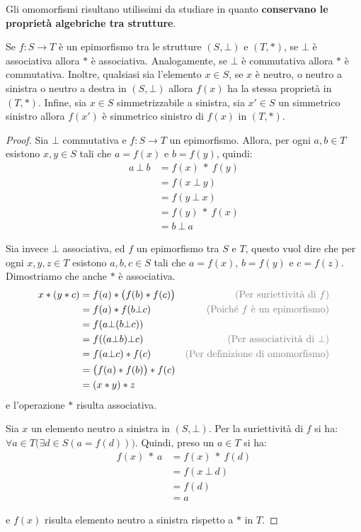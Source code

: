 Gli omomorfismi risultano utilissimi da studiare in quanto \textbf{conservano le proprietà algebriche tra strutture}.

\begin{propbox}
	Se $f:S \rightarrow T$ è un epimorfismo tra le strutture $(S, \bot)$ e $(T, \ast)$, se $\bot$ è associativa allora $\ast$ è associativa. Analogamente, se $\bot$ è commutativa allora $\ast$ è commutativa. Inoltre, qualsiasi sia l'elemento $x \in S$, se $x$ è neutro, o neutro a sinistra o neutro a destra in $(S, \bot)$ allora $f(x)$ ha la stessa proprietà in $(T,\ast)$. Infine, sia $x \in S$ simmetrizzabile a sinistra, sia $x' \in S$ un simmetrico sinistro allora $f(x')$ è simmetrico sinistro di $f(x)$ in $(T, \ast)$.
\end{propbox}


\begin{proof}
	Sia $\bot$ commutativa e $f:S \rightarrow T$ un epimorfismo. Allora, per ogni $a,b \in T$ esistono $x,y \in S$ tali che $a=f(x)$ e $b=f(y)$, quindi:
	\begin{align*}
		a \ \bot \ b &= f(x) \ \ast \ f(y) \\
		&= f(x \ \bot \ y) \\
		&= f(y \ \bot \ x) \\
		&= f(y) \ \ast \ f(x)  \\
		&= b \ \bot \ a
	\end{align*}
	
	Sia invece $\bot$ associativa, ed $f$ un epimorfismo tra $S$ e $T$, questo vuol dire che per ogni $x,y,z \in T$ esistono $a,b,c \in S$ tali che $a=f(x)$, $b=f(y)$ e $c=f(z)$. Dimostriamo che anche $\ast$ è associativa.
	\begin{align*}
	x \ast (y \ast c) &= f(a) \ast \bigl(f(b) \ast f(c) \bigr) & \text{\textcolor{gray}{(Per suriettività di $f$)}} \\
	&= f(a) \ast f(b \bot c)  & \text{\textcolor{gray}{(Poiché $f$ è un epimorfismo)}} \\
	&= f(a \bot (b \bot c)) \\
	&= f((a \bot b) \bot c)   & \text{\textcolor{gray}{(Per associatività di $\bot$)}} \\
	&= f(a \bot c) \ast f(c)  & \text{\textcolor{gray}{(Per definizione di omomorfismo)}} \\
	&= \bigl(f(a) \ast f(b)\bigr) \ast f(c)\\ 
	&= (x \ast y) \ast z
	\end{align*}
	e l'operazione $\ast$ risulta associativa.
	
	Sia $x$ un elemento neutro a sinistra in $(S, \bot)$. Per la suriettività di $f$ si ha: $\forall a \in T \bigl( \exists d \in S (a= f(d))\bigr)$. Quindi, preso un $a \in T$ si ha:
	\begin{align*}
		f(x) \ \ast \ a &= f(x) \ \ast \ f(d) \\
		&= f(x \ \bot \ d)\\
		&= f(d) \\
		&= a 
	\end{align*}
	 
	e $f(x)$ risulta elemento neutro a sinistra rispetto a $\ast$ in $T$. 
\end{proof}

